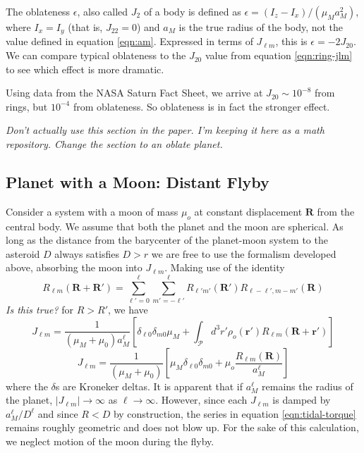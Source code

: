 \documentclass[linenumbers]{aastex631}
\newcommand{\brackets}[1]{\left[ #1 \right]}
\newcommand{\jtd}[1]{{\color{red}\textit{#1}}}
\begin{document}
The oblateness $\epsilon$, also called $J_2$ of a body is defined as $\epsilon = (I_z - I_x)/(\mu_M a_M^2)$, where $I_x = I_y$ (that is, $J_{22} = 0$) and $a_M$ is the true radius of the body, not the value defined in equation \ref{eqn:am}. Expressed in terms of $J_{\ell m}$, this is $\epsilon = -2J_{20}$. We can compare typical oblateness to the $J_{20}$ value from equation \ref{eqn:ring-jlm} to see which effect is more dramatic.

Using data from the NASA Saturn Fact Sheet, we arrive at $J_{20}\sim 10^{-8}$ from rings, but $10^{-4}$ from oblateness. So oblateness is in fact the stronger effect.

\jtd{Don't actually use this section in the paper. I'm keeping it here as a math repository. Change the section to an oblate planet.}

\subsection{Planet with a Moon: Distant Flyby}
Consider a system with a moon of mass $\mu_{o}$ at constant displacement $\mathbf R$ from the central body. We assume that both the planet and the moon are spherical. As long as the distance from the barycenter of the planet-moon system to the asteroid $D$ always satisfies $D>r$ we are free to use the formalism developed above, absorbing the moon into $J_{\ell m}$. Making use of the identity \cite{Gelderen1998TheSO}
\begin{equation}
R_{\ell m}(\mathbf R + \mathbf R') = \sum_{\ell' = 0}^\ell \sum_{m'=-\ell'}^\ell R_{\ell' m'}(\mathbf R') R_{\ell-\ell', m-m'}(\mathbf R)
\end{equation}
\jtd{Is this true?}
for $R > R'$, we have
\begin{equation}
J_{\ell m} = \frac{1}{(\mu_M+\mu_0) a_M^\ell}\brackets{\delta_{\ell 0}\delta_{m0}\mu_M + \int_\mathcal{P} d^3 r' \rho_o(\mathbf r') R_{\ell m}(\mathbf R + \mathbf r')}
\end{equation}
\begin{equation}
J_{\ell m} = \frac{1}{(\mu_M+\mu_0)}\brackets{\mu_M\delta_{\ell 0}\delta_{m0} + \mu_o \frac{R_{\ell m}(\mathbf R)}{ a_M^\ell}}
\end{equation}
where the $\delta$s are Kroneker deltas. It is apparent that if $a_M^\ell$ remains the radius of the planet, $|J_{\ell m}| \rightarrow \infty$ as $\ell \rightarrow \infty$. However, since each $J_{\ell m}$ is damped by $a_M^\ell / D^\ell$ and since $R < D$ by construction, the series in equation \ref{eqn:tidal-torque} remains roughly geometric and does not blow up. For the sake of this calculation, we neglect motion of the moon during the flyby.
\end{document}
